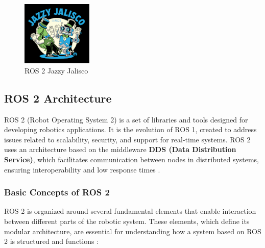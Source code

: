 \begin{figure}[h!]
    \centering
    \includegraphics[width=0.3\textwidth]{pictures/jazzy_logo.png}
    \caption{ROS 2 Jazzy Jalisco}
    \label{fig:imagen2}
\end{figure}

\subsection{ROS 2 Architecture}

    ROS 2 (Robot Operating System 2) is a set of libraries and tools designed for developing robotics applications. It is the evolution of ROS 1, created to address issues related to scalability, security, and support for real-time systems. ROS 2 uses an architecture based on the middleware \textbf{DDS (Data Distribution Service)}, which facilitates communication between nodes in distributed systems, ensuring interoperability and low response times \cite{ros_docs}.  
    
    \subsubsection{Basic Concepts of ROS 2}
    
    ROS 2 is organized around several fundamental elements that enable interaction between different parts of the robotic system. These elements, which define its modular architecture, are essential for understanding how a system based on ROS 2 is structured and functions \cite{ros_docs}:  
    
